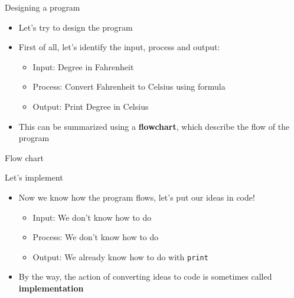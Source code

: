 \documentclass[10pt,xcolor={table,dvipsnames},t]{beamer}
\begin{document}
\begin{frame}{Designing a program}
  \begin{itemize}
    \item Let's try to design the program
    \item First of all, let's identify the input, process and output:
    \begin{itemize}
      \item Input: Degree in Fahrenheit
      \item Process: Convert Fahrenheit to Celsius using formula
      \item Output: Print Degree in Celsius
    \end{itemize}
    \item This can be summarized using a \textbf{flowchart}, which describe the flow of the program
  \end{itemize}
  
\end{frame}

\begin{frame}{Flow chart}
  \begin{figure}
  \end{figure}
\end{frame}

\begin{frame}{Let's implement}
  \begin{itemize}
    \item Now we know how the program flows, let's put our ideas in code! 
    \begin{itemize}
      \item Input: We don't know how to do
      \item Process: We don't know how to do 
      \item Output: We already know how to do with \texttt{print}
    \end{itemize}
    \item By the way, the action of converting ideas to code is sometimes called \textbf{implementation}
  \end{itemize}
\end{frame}
\end{document}
